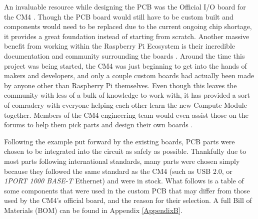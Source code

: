 An invaluable resource while designing the PCB was the Official I/O board for the CM4 \cite{rpi_cm4_io}.
Though the PCB board would still have to be custom built and components would need to be replaced due to the current ongoing chip shortage, it provides a great foundation instead of starting from scratch.
Another massive benefit from working within the Raspberry Pi Ecosystem is their incredible documentation and community surrounding the boards \cite{rpi_cm4_docs}.
Around the time this project was being started, the CM4 was just beginning to get into the hands of makers and developers, and only a couple custom boards had actually been made by anyone other than Raspberry Pi themselves.
Even though this leaves the community with less of a bulk of knowledge to work with, it has provided a sort of comradery with everyone helping each other learn the new Compute Module together.
Members of the CM4 engineering team would even assist those on the forums to help them pick parts and design their own boards \cite{cm4_datasheet_problem,rtc_kernelpatch}.

Following the example put forward by the existing boards, PCB parts were chosen to be integrated into the circuit as safely as possible.
Thankfully due to most parts following international standards, many parts were chosen simply because they followed the same standard as the CM4 (such as USB 2.0, or \emph{1PORT 1000 BASE-T} Ethernet) and were in stock.
What follows is a table of some components that were used in the custom PCB that may differ from those used by the CM4's official board, and the reason for their selection.
A full Bill of Materials (BOM) can be found in Appendix \ref{AppendixB}.

